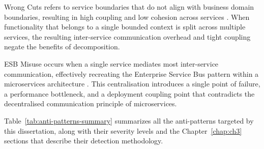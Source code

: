 
\par Wrong Cuts refers to service boundaries that do not align with business domain boundaries, resulting in high coupling and low cohesion across services \cite{Taibi2018}. When functionality that belongs to a single bounded context is split across multiple services, the resulting inter-service communication overhead and tight coupling negate the benefits of decomposition.


\par ESB Misuse occurs when a single service mediates most inter-service communication, effectively recreating the Enterprise Service Bus pattern within a microservices architecture \cite{Richards2015}. This centralisation introduces a single point of failure, a performance bottleneck, and a deployment coupling point that contradicts the decentralised communication principle of microservices.


Table~\ref{tab:anti-patterns-summary} summarizes all the anti-patterns targeted by this dissertation, along with their severity levels and the Chapter~\ref{chap:ch3} sections that describe their detection methodology.

